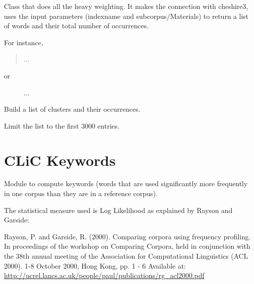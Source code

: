 \documentclass[letterpaper,10pt,english]{sphinxmanual}
\begin{document}
\begin{fulllineitems}
\label{apidoc:clusters.Clusters}
Class that does all the heavy weighting. It makes the connection with
cheshire3, uses the input parameters (indexname and subcorpus/Materials) to
return a list of words and their total number of occurrences.

For instance,
\begin{quote}



...
\end{quote}
\begin{description}
\item[{or}] \leavevmode
{}


...

\end{description}

\begin{fulllineitems}
\label{apidoc:clusters.Clusters.list_clusters}
Build a list of clusters and their occurrences.

Limit the list to the first 3000 entries.

\end{fulllineitems}


\end{fulllineitems}



\section{CLiC Keywords}
\label{apidoc:module-keywords}\label{apidoc:clic-keywords}
Module to compute keywords (words that are used significantly more frequently
in one corpus than they are in a reference corpus).

The statistical measure used is
Log Likelihood as explained by Rayson and Garside:

Rayson, P. and Garside, R. (2000). Comparing corpora using frequency profiling. 
In proceedings of the workshop on Comparing Corpora, held in conjunction with the 38th 
annual meeting of the Association for Computational Linguistics (ACL 2000). 
1-8 October 2000, Hong Kong, pp. 1 - 6
Available at: \href{http://ucrel.lancs.ac.uk/people/paul/publications/rg\_acl2000.pdf}{http://ucrel.lancs.ac.uk/people/paul/publications/rg\_acl2000.pdf}
\end{document}
